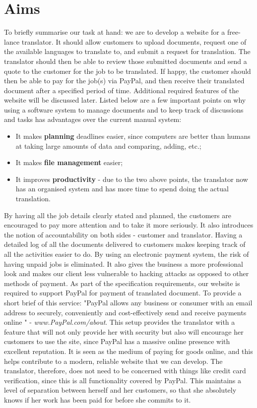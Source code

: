 \documentclass{l3proj}
\begin{document}
\section{Aims}
To briefly summarise our task at hand: we are to develop a website for a
free-lance translator. It should allow customers to upload documents, request
one of the available languages to translate to, and submit a request for
translation. The translator should then be able to review those submitted
documents and send a quote to the customer for the job to be translated. If
happy, the customer should then be able to pay for the job(s) via PayPal, and
then receive their translated document after a specified period of time.
Additional required features of the website will be discussed later. Listed
below are a few important points on why using a software system to manage
documents and to keep track of discussions and tasks has advantages over the
current manual system:

\begin{itemize}
	\item
	It makes {\bf planning} deadlines easier, since computers are better than humans
	at taking large amounts of data and comparing, adding, etc.;
	\item
	It makes {\bf file management} easier;
	\item
	It improves {\bf productivity} - due to the two above points, the
translator now has an organised system and has more time to spend doing the
actual translation.
\end{itemize}

By having all the job details clearly stated and planned, the customers are
encouraged to pay more attention and to take it more seriously. It also
introduces the notion of accountability on both sides - customer and translator.
Having a detailed log of all the documents delivered to customers makes keeping
track of all the activities easier to do. By using an electronic payment system,
the risk of having unpaid jobs is eliminated. It also gives the business a more
professional look and makes our client less vulnerable to hacking attacks as
opposed to other methods of payment. As part of the specification requirements,
our website is required to support PayPal for payment of translated document. To
provide a short brief of this service: "PayPal allows any business or consumer
with an email address to securely, conveniently and cost-effectively send and
receive payments online " - \textit{\small{www.PayPal.com/about}}. This setup
provides the translator with a feature that will not only provide her with
security but also will encourage her customers to use the site, since PayPal has
a massive online presence with excellent reputation. It is seen as the medium of
paying for goods online, and this helps contribute to a modern, reliable website
that we can develop. The translator, therefore, does not need to be concerned
with things like credit card verification, since this is all functionality
covered by PayPal. This maintains a level of separation between herself and her
customers, so that she absolutely knows if her work has been paid for before she
commits to it. \\
\end{document}
